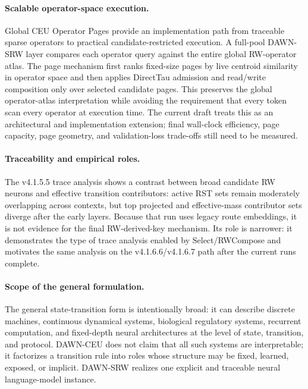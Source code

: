 \documentclass{article}
\begin{document}
\paragraph{Scalable operator-space execution.}
Global CEU Operator Pages provide an implementation path from traceable sparse operators to practical candidate-restricted execution. A full-pool DAWN-SRW layer compares each operator query against the entire global RW-operator atlas. The page mechanism first ranks fixed-size pages by live centroid similarity in operator space and then applies DirectTau admission and read/write composition only over selected candidate pages. This preserves the global operator-atlas interpretation while avoiding the requirement that every token scan every operator at execution time. The current draft treats this as an architectural and implementation extension; final wall-clock efficiency, page capacity, page geometry, and validation-loss trade-offs still need to be measured.

\paragraph{Traceability and empirical roles.}
The v4.1.5.5 trace analysis shows a contrast between broad candidate RW neurons and effective transition contributors: active RST sets remain moderately overlapping across contexts, but top projected and effective-mass contributor sets diverge after the early layers. Because that run uses legacy route embeddings, it is not evidence for the final RW-derived-key mechanism. Its role is narrower: it demonstrates the type of trace analysis enabled by Select/RWCompose and motivates the same analysis on the v4.1.6.6/v4.1.6.7 path after the current runs complete.

\paragraph{Scope of the general formulation.}
The general state-transition form is intentionally broad: it can describe discrete machines, continuous dynamical systems, biological regulatory systems, recurrent computation, and fixed-depth neural architectures at the level of state, transition, and protocol. DAWN-CEU does not claim that all such systems are interpretable; it factorizes a transition rule into roles whose structure may be fixed, learned, exposed, or implicit. DAWN-SRW realizes one explicit and traceable neural language-model instance.
\end{document}
